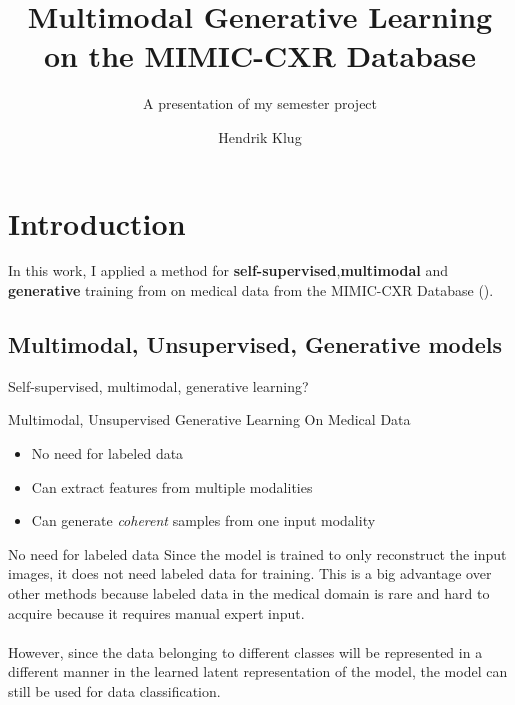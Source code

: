 

\title{Multimodal Generative Learning on the MIMIC-CXR Database}
\subtitle{A presentation of my semester project}
\author{Hendrik Klug}

    \begin{frame}
        \titlepage
    \end{frame}


    \section{Introduction}

    \begin{frame}
        In this work, I applied a method for \textbf{self-supervised},\textbf{multimodal} and \textbf{generative} training from \cite{thomas_multimodal} on medical data from the MIMIC-CXR Database (\cite{johnson2019mimic}).
    \end{frame}

    \subsection{Multimodal, Unsupervised, Generative models}
    \begin{frame}{Self-supervised, multimodal, generative learning?}
    \end{frame}

    \begin{frame}{Multimodal, Unsupervised Generative Learning On Medical Data}
        \begin{itemize}
            \item No need for labeled data
            \item Can extract features from multiple modalities
            \item Can generate \textit{coherent} samples from one input modality
        \end{itemize}
    \end{frame}
    
    \begin{frame}{No need for labeled data}
    Since the model is trained to only reconstruct the input images, it does not need labeled data for training.
    This is a big advantage over other methods because labeled data in the medical domain is rare and hard to acquire because it requires manual expert input.\\
    \\
    \pause
    However, since the data belonging to different classes will be represented in a different manner in the learned latent representation of the model, the model can still be used for data classification.
        
    \end{frame}
